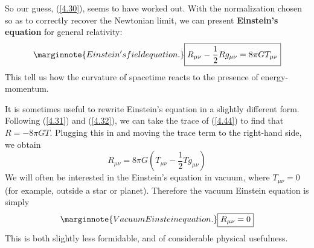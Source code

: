 So our guess, (\ref{4.30}), seems to have worked out. With the normalization chosen so as to correctly recover the Newtonian limit, we can present \textbf{Einstein's equation} for general relativity:
\begin{equation}\label{4.44}\marginnote{Einstein's field equation.}
    \boxed{R_{\mu\nu}-\frac{1}{2}Rg_{\mu\nu}=8\pi GT_{\mu\nu}}
\end{equation}
This tell us how the curvature of spacetime reacts to the presence of energy-momentum.

It is sometimes useful to rewrite Einstein's equation in a slightly different form. Following (\ref{4.31}) and (\ref{4.32}), we can take the trace of (\ref{4.44}) to find that $R=-8\pi GT$. Plugging this in and moving the trace term to the right-hand side, we obtain
\begin{equation}\label{4.45}
    \boxed{R_{\mu\nu}=8\pi G\left(T_{\mu\nu}-\frac{1}{2}Tg_{\mu\nu}\right)}
\end{equation}
We will often be interested in the Einstein's equation in vacuum, where $T_{\mu\nu}=0$ (for example, outside a star or planet). Therefore the vacuum Einstein equation is simply
\begin{equation}\label{4.46}\marginnote{Vacuum Einstein equation.}
    \boxed{R_{\mu\nu}=0}
\end{equation}
This is both slightly less formidable, and of considerable physical usefulness.